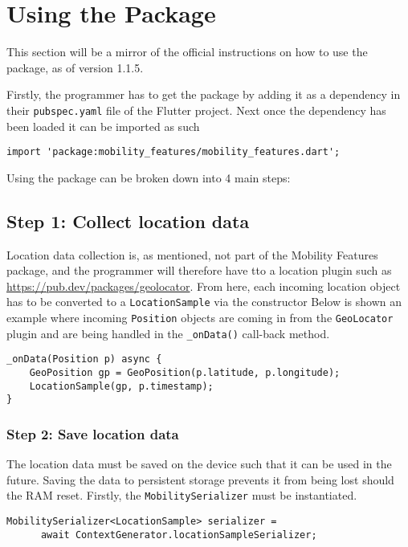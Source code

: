 \section{Using the Package}
This section will be a mirror of the official instructions on how to use the package, as of version 1.1.5.

Firstly, the programmer has to get the package by adding it as a dependency in their \verb|pubspec.yaml| file of the Flutter project. Next once the dependency has been loaded it can be imported as such

\begin{verbatim}
import 'package:mobility_features/mobility_features.dart';
\end{verbatim}

Using the package can be broken down into 4 main steps:

\subsection*{Step 1: Collect location data}
Location data collection is, as mentioned, not part of the Mobility Features package, and the programmer will therefore have tto a location plugin such as \url{https://pub.dev/packages/geolocator}. From here, each incoming location object has to be converted to a \verb|LocationSample| via the constructor
Below is shown an example where incoming \verb|Position| objects are coming in from the \verb|GeoLocator| plugin and are being handled in the \verb|_onData()| call-back method.

\begin{verbatim}
_onData(Position p) async {
    GeoPosition gp = GeoPosition(p.latitude, p.longitude);
    LocationSample(gp, p.timestamp);
}
\end{verbatim}

\subsubsection*{Step 2: Save location data}
The location data must be saved on the device such that it can be used in the future. Saving the data to persistent storage prevents it from being lost should the RAM reset. Firstly, the \verb|MobilitySerializer| must be instantiated.

\begin{verbatim}
MobilitySerializer<LocationSample> serializer =
      await ContextGenerator.locationSampleSerializer;
\end{verbatim}

